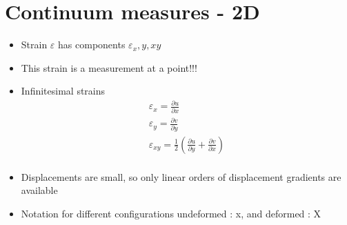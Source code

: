 \section{Continuum measures - 2D}

	\begin{frame}
		\begin{block}{}
			\begin{itemize}
				\item Strain $\varepsilon$ has components $\varepsilon_x,y,xy$
				 \item This strain is a measurement at a point!!!
				 \item Infinitesimal strains 
				 \begin{align*}
				 	\varepsilon_x = \frac{\partial u}{\partial x} \\
					\varepsilon_y = \frac{\partial v}{\partial y} \\
					\varepsilon_{xy} = \frac{1}{2}\left( \frac{\partial u}{\partial y} + \frac{\partial v}{\partial x}\right) \\
				 \end{align*}
				
			\end{itemize}
		\end{block}
	\begin{itemize}
		\item Displacements are small, so only linear orders of displacement gradients are available
		\item Notation for different configurations undeformed : x, and deformed : X
		
	\end{itemize}
	\end{frame}